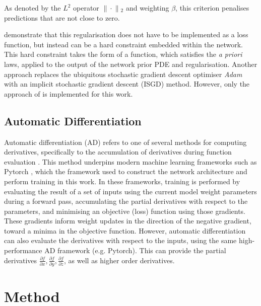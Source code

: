 \documentclass[manuscript.tex]{subfiles}
\begin{document}
As denoted by the \(L^2\) operator \(\lVert{}\cdot{}\rVert{}_{2}\) and weighting \(\beta{}\), this criterion penalises predictions that are not close to zero.

\Textcite{sethiHardEnforcementPhysicsinformed2023} demonstrate that this regularisation does not have to be implemented as a loss function, but instead can be a hard constraint embedded within the network.
This hard constraint takes the form of a function, which satisfies the \emph{a priori} laws, applied to the output of the network prior PDE and regularisation.
Another approach \parencite{liImplicitStochasticGradient2023} replaces the ubiquitous stochastic gradient descent optimiser \emph{Adam} with an implicit stochastic gradient descent (ISGD) method.
However, only the approach of \textcite{benbarkaSeeingImplicitNeural2022} is implemented for this work.

\subsection{Automatic Differentiation}
Automatic differentiation (AD) refers to one of several methods for computing derivatives, specifically to the accumulation of derivatives during function evaluation \parencite{baydin2018automatic}.
This method underpins modern machine learning frameworks such as Pytorch \parencite{paszkePyTorchImperativeStyle2019}, which the framework used to construct the network architecture and perform training in this work.
In these frameworks, training is performed by evaluating the result of a set of inputs using the current model weight parameters during a forward pass, accumulating the partial derivatives with respect to the parameters, and minimising an objective (loss) function using those gradients.
These gradients inform weight updates in the direction of the negative gradient, toward a minima in the objective function.
However, automatic differentiation can also evaluate the derivatives with respect to the inputs, using the same high-performance AD framework (e.g. Pytorch).
This can provide the partial derivatives \(\frac{\partial f}{\partial x}, \frac{\partial f}{\partial y}, \frac{\partial f}{\partial z}\), as well as higher order derivatives.

\section{Method}
\end{document}
